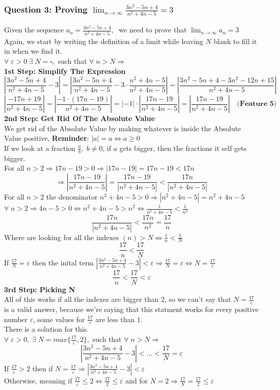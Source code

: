 \subsubsection{Question 3: Proving \(\lim_{n \to \infty} \frac{3n^2-5n+4}{n^2+4n-5} = 3\)}
Given the sequence $a_n = \frac{3n^2-5n+4}{n^2+4n-5},\;$ we need to prove that $\lim_{n\to\infty}a_n = 3$\\
Again, we start by writing the definition of a limit while leaving $N$ blank to fill it in when we find it.\\
$\forall\; \varepsilon>0\; \exists\;N = \square ,$ such that $\forall\; n>N\Longrightarrow$\\
\textbf{1st Step: Simplify The Expression}
\[
    |\frac{3n^2-5n+4}{n^2+4n-5}-3| = |\frac{3n^2-5n+4}{n^2+4n-5} -3\cdot\frac{n^2+4n-5}{n^2+4n-5}|=|\frac{3n^2-5n+4-3n^2-12n+15}{n^2+4n-5}|
\]
\[
    |\frac{-17n+19}{n^2+4n-5}| =|\frac{-1\cdot(17n-19)}{n^2+4n-5}| = |-1|\cdot|\frac{17n-19}{n^2+4n-5}| = |\frac{17n-19}{n^2+4n-5}| \quad \textbf{(Feature 5)}
\]
\textbf{2nd Step: Get Rid Of The Absolute Value}\\
We get rid of the Absolute Value by making whatever is inside the Absolute Value positive, \textbf{Reminder}: $|a| = a \iff a \geq 0$\\
If we look at a fraction $\frac{a}{b},\; b\neq 0$, if $a$ gets bigger, then the fractions it self gets bigger.\\
For all $n>2\Longrightarrow 17n-19>0 \Longrightarrow |17n-19|=17n-19<17n$
\[
    \Longrightarrow |\frac{17n-19}{n^2+4n-5}|=\frac{17n-19}{|n^2+4n-5|}<\frac{17n}{|n^2+4n-5|}
\]
For all $n>2$ the denominator $n^2+4n-5>0\Longrightarrow |n^2+4n-5| = n^2+4n-5$\\
$\forall\; n>2\Longrightarrow 4n-5>0 \iff n^2+4n-5>n^2\iff \frac{1}{n^2+4n-5}<\frac{1}{n^2}$ 
\[
    \frac{17n}{|n^2+4n-5|}<\frac{17n}{n^2}=\frac{17}{n}
\]
Where are looking for all the indexes $(n)>N \iff \frac{1}{n}<\frac{1}{N}$
\[
    \frac{17}{n}<\frac{17}{N}
\]
If $\frac{17}{N} = \varepsilon$ then the inital term $|\frac{3n^2-5n+4}{n^2+4n-5}-3|<\varepsilon \Longrightarrow \frac{17}{N}=\varepsilon \iff N=\frac{17}{\varepsilon}$
\[
    \frac{17}{n}<\frac{17}{N}<\varepsilon
\]
\textbf{3rd Step: Picking N}\\
All of this works if all the indexes are bigger than $2$, so we can't say that $N=\frac{17}{\varepsilon}$ is a valid answer, because we're saying that this statment works for every positive number $\varepsilon$, some values for $\frac{17}{\varepsilon}$ are less than $1$.\\
There is a solution for this.\\
$\forall\; \varepsilon>0 ,\; \exists\; N=max\{\frac{17}{\varepsilon},2\},$ such that $\forall\; n>N\Longrightarrow$
\[
    |\frac{3n^2-5n+4}{n^2+4n-5}-3|<\ldots<\frac{17}{N}=\varepsilon
\]
If $\frac{17}{\varepsilon}>2$ then if $N = \frac{17}{\varepsilon}\Longrightarrow |\frac{3n^2-5n+4}{n^2+4n-5}-3|<\varepsilon$\\
Otherwise, meaning if $\frac{17}{\varepsilon}\leq 2 \iff \frac{17}{2}\leq \varepsilon$ and for $N=2\Longrightarrow \frac{17}{N}=\frac{17}{2}\leq \varepsilon$\\



